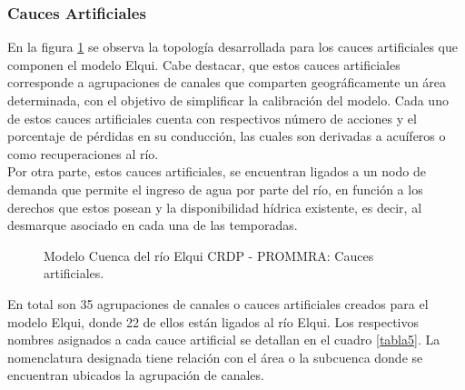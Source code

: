 \documentclass[11pt,]{article}
\begin{document}
\subsubsection{Cauces Artificiales}\bigskip

En la figura  \ref{etiqueta_figura8} se observa la topología desarrollada para los cauces artificiales que componen el modelo Elqui. Cabe destacar, que estos cauces artificiales corresponde a agrupaciones de canales que comparten geográficamente un área determinada, con el objetivo de simplificar la calibración del modelo. Cada uno de estos cauces artificiales cuenta con respectivos número de acciones y el porcentaje de pérdidas en su conducción, las cuales son derivadas a acuíferos o como recuperaciones al río. \\

Por otra parte, estos cauces artificiales, se encuentran ligados a un nodo de demanda que permite el ingreso de agua por parte del río, en función a los derechos que estos posean y la disponibilidad hídrica existente, es decir, al desmarque asociado en cada una de las temporadas. \\

\begin{figure}[H]
\begin{center}
\caption{Modelo Cuenca del río Elqui CRDP - PROMMRA: Cauces artificiales.}
\label{etiqueta_figura8}
\end{center}
\end{figure}

En total son 35 agrupaciones de canales o cauces artificiales creados para el modelo Elqui, donde 22 de ellos están ligados al río Elqui. Los respectivos nombres asignados a cada cauce artificial se detallan en el cuadro \ref{tabla5}. La nomenclatura designada tiene relación con el área o la subcuenca donde se encuentran ubicados la agrupación de canales.\\
\end{document}

